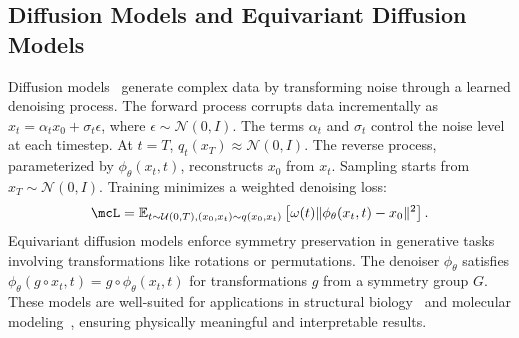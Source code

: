 \subsection{Diffusion Models and Equivariant Diffusion Models}

Diffusion models~ generate complex data by transforming noise through a learned denoising process. The forward process corrupts data incrementally as \( x_t = \alpha_t x_0 + \sigma_t \epsilon \), where \( \epsilon \sim \mathcal{N}(0, I) \). The terms \( \alpha_t \) and \( \sigma_t \) control the noise level at each timestep. At \( t = T \), \( q_t(x_T) \approx \mathcal{N}(0, I) \). The reverse process, parameterized by \( \phi_\theta(x_t, t) \), reconstructs \( x_0 \) from \( x_t \). Sampling starts from \( x_T \sim \mathcal{N}(0, I) \). Training minimizes a weighted denoising loss: 
\begin{equation}
    \mcL = \mathbb{E}_{t \sim \mathcal{U}(0, T), (x_0, x_t) \sim q(x_0, x_t)} \left[ \omega(t) \| \phi_\theta (x_t, t) - x_0 \|^2 \right].
    \label{eqn:diff_loss}
\end{equation}
Equivariant diffusion models enforce symmetry preservation in generative tasks involving transformations like rotations or permutations. The denoiser \( \phi_\theta \) satisfies \( \phi_\theta (g \circ x_t , t) = g \circ \phi_\theta (x_t, t) \) for transformations \( g \) from a symmetry group \( G \). These models are well-suited for applications in structural biology~ and molecular modeling~, ensuring physically meaningful and interpretable results.


